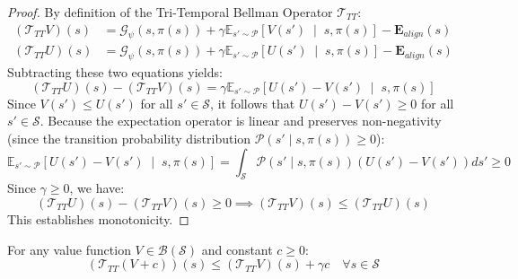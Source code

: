 \documentclass[manuscript, screen, review]{jair}
\begin{document}
\begin{proof}
By definition of the Tri-Temporal Bellman Operator $\mathcal{T}_{TT}$:
\begin{align*}
    \left( \mathcal{T}_{TT} V \right)(s) &= \mathcal{G}_\psi(s, \pi(s)) + \gamma \mathbb{E}_{s' \sim \mathcal{P}} \left[ V(s') \;\middle|\; s, \pi(s) \right] - \mathbf{E}_{align}(s) \\
    \left( \mathcal{T}_{TT} U \right)(s) &= \mathcal{G}_\psi(s, \pi(s)) + \gamma \mathbb{E}_{s' \sim \mathcal{P}} \left[ U(s') \;\middle|\; s, \pi(s) \right] - \mathbf{E}_{align}(s)
\end{align*}
Subtracting these two equations yields:
\begin{equation*}
    \left( \mathcal{T}_{TT} U \right)(s) - \left( \mathcal{T}_{TT} V \right)(s) = \gamma \mathbb{E}_{s' \sim \mathcal{P}} \left[ U(s') - V(s') \;\middle|\; s, \pi(s) \right]
\end{equation*}
Since $V(s') \le U(s')$ for all $s' \in \mathcal{S}$, it follows that $U(s') - V(s') \ge 0$ for all $s' \in \mathcal{S}$. Because the expectation operator is linear and preserves non-negativity (since the transition probability distribution $\mathcal{P}(s' \mid s, \pi(s)) \ge 0$):
\begin{equation*}
    \mathbb{E}_{s' \sim \mathcal{P}} \left[ U(s') - V(s') \;\middle|\; s, \pi(s) \right] = \int_{\mathcal{S}} \mathcal{P}(s' \mid s, \pi(s)) \left( U(s') - V(s') \right) ds' \ge 0
\end{equation*}
Since $\gamma \ge 0$, we have:
\begin{equation*}
    \left( \mathcal{T}_{TT} U \right)(s) - \left( \mathcal{T}_{TT} V \right)(s) \ge 0 \implies \left( \mathcal{T}_{TT} V \right)(s) \le \left( \mathcal{T}_{TT} U \right)(s)
\end{equation*}
This establishes monotonicity.
\end{proof}

\begin{lemma}\label{lem:discounting_proof}
For any value function $V \in \mathcal{B}(\mathcal{S})$ and constant $c \ge 0$:
\begin{equation}
    \left( \mathcal{T}_{TT} (V + c) \right)(s) \le \left( \mathcal{T}_{TT} V \right)(s) + \gamma c \quad \forall s \in \mathcal{S}
\end{equation}
\end{lemma}
\end{document}
